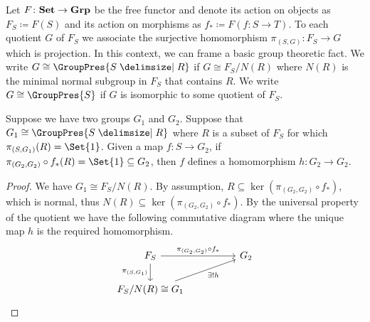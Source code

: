 Let $F \colon \mathbf{Set} \to \mathbf{Grp}$ be the free functor and denote its action on objects as $F_S \coloneqq F(S)$ and its action on morphisms as  $f_* \coloneqq F(f \colon S \to T)$.
To each quotient $G$ of $F_S$ we associate the surjective homomorphism $\pi_{(S,G)} \colon F_S \to G$ which is projection.
In this context, we can frame a basic group theoretic fact.
We write $G \cong \GroupPres{S \relations R}$ if  $G \cong F_S / N(R)$ where $N(R)$ is the minimal normal subgroup in $F_S$ that contains $R$.
We write  $G \cong \GroupPres{S}$ if  $G$ is isomorphic to some quotient of  $F_S$.

\begin{theorem}
	Suppose we have two groups $G_1$ and $G_2$.
	Suppose that $G_1 \cong \GroupPres{S \relations R}$ where $R$ is a subset of $F_S$ for which $\pi_{(S,G_1)}(R) = \Set{1}$.
	Given a map $f \colon S \to G_2$, if  $\pi_{(G_2, G_2)} \circ f_*(R) = \Set{1} \subseteq G_2$, then $f$ defines a homomorphism $h \colon G_2 \to G_2$.
	\label{thm:homomorphism_universal_prop}
\end{theorem}
\begin{proof}
	We have $G_1 \cong F_{S}/N(R)$.
	By assumption, $R \subseteq \ker(\pi_{(G_2,G_2)} \circ f_*)$, which is normal, thus $N(R) \subseteq \ker(\pi_{(G_2,G_2)} \circ f_*)$.
	By the universal property of the quotient we have the following commutative diagram where the unique map $h$ is the required homomorphism.
	\begin{equation*}
		\begin{tikzcd}
			F_{S} \ar[rr, "\pi_{(G_2,G_2)} \circ f_*"] \ar[d, "\pi_{(S,G_1)}"'] & & G_2 \\
			F_{S}/N(R) \cong G_1 \ar[rru, "\exists ! h"']
		\end{tikzcd}
	\end{equation*}
\end{proof}

